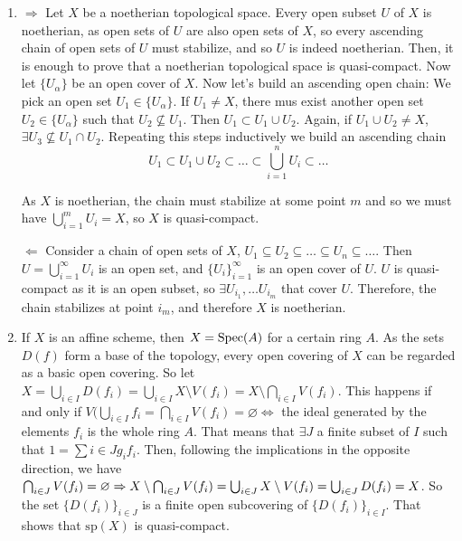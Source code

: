 \begin{sol}
	\begin{enumerate}[label=\alph*)]
		\item $\boxed{\Rightarrow}$ Let $X$ be a noetherian topological space. Every open subset $U$ of $X$ is noetherian, as open sets of $U$ are also open sets of $X$, so every ascending chain of open sets of $U$ must stabilize, and so $U$ is indeed noetherian. Then, it is enough to prove that a noetherian topological space is quasi-compact. Now let $\{U_{\alpha}\}$ be an open cover of $X$. Now let's build an ascending open chain: We pick an open set $U_1 \in \{U_{\alpha}\}$. If $U_1 \neq X$, there mus exist another open set $U_2 \in \{U_{\alpha}\}$ such that $U_2 \not\subseteq U_1$. Then $U_1 \subset U_1 \cup U_2$. Again, if $U_1 \cup U_2 \neq X$, $\exists U_3 \not\subseteq U_1 \cap U_2$. Repeating this steps inductively we build an ascending chain
		\[
			U_1 \subset U_1 \cup U_2 \subset \dots \subset \bigcup_{i = 1}^n U_i \subset \dots
		\]

		As $X$ is noetherian, the chain must stabilize at some point $m$ and so we must have $\bigcup_{i = 1}^m U_i = X$, so $X$ is quasi-compact.

		$\boxed{\Leftarrow}$ Consider a chain of open sets of $X$, $U_1 \subseteq U_2 \subseteq \dots \subseteq U_n \subseteq \dots$. Then $U = \bigcup_{i = 1}^\infty U_i$ is an open set, and $\{U_i\}_{i = 1}^{\infty}$ is an open cover of $U$. $U$ is quasi-compact as it is an open subset, so $\exists U_{i_1}, \dots U_{i_m}$ that cover $U$. Therefore, the chain stabilizes at point $i_m$, and therefore $X$ is noetherian.

		\item If $X$ is an affine scheme, then $X = \mathrm{Spec}(A)$ for a certain ring $A$. As the sets $D(f)$ form a base of the topology, every open covering of $X$ can be regarded as a basic open covering. So let $X = \bigcup_{i \in I} D(f_i) = \bigcup_{i \in I} X \setminus V(f_i) = X \setminus \bigcap_{i \in I} V(f_i)$. This happens if and only if $V(\bigcup_{i \in I}f_i = \bigcap_{i \in I} V(f_i) = \varnothing \iff$ the ideal generated by the elements $f_i$ is the whole ring $A$. That means that $\exists J$ a finite subset of $I$ such that $1 = \sum{i \in J}g_i f_i$. Then, following the implications in the opposite direction, we have $\bigcap_{i \in J} V(f_i) = \varnothing \Rightarrow X \setminus \bigcap_{i \in J}V(f_i) = \bigcup_{i \in J} X \setminus V(f_i) = \bigcup_{i \in J} D(f_i) = X$. So the set $\{D(f_i)\}_{i \in J}$ is a finite open subcovering of $\{D(f_i)\}_{i \in I}$. That shows that $\mathrm{sp}(X)$ is quasi-compact.


\end{enumerate}
\end{sol}
